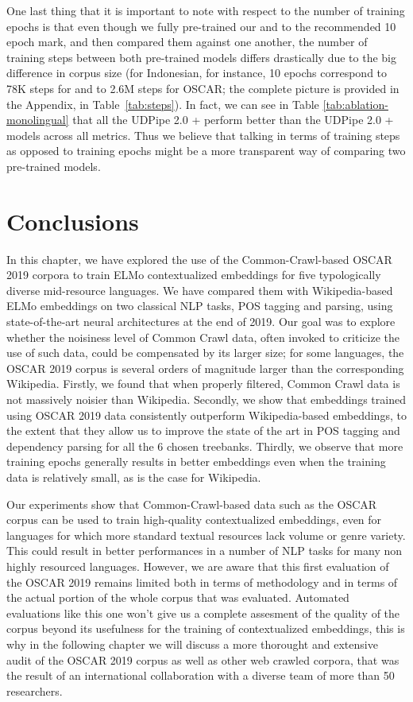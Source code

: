 One last thing that it is important to note with respect to the number of training epochs is that even though we fully pre-trained our \elmowikis and \elmooscars to the recommended 10 epoch mark, and then compared them against one another, the number of training steps between both pre-trained models differs drastically due to the big difference in corpus size (for Indonesian, for instance, 10 epochs correspond to 78K steps for \elmowiki and to 2.6M steps for OSCAR; the complete picture is provided in the Appendix, in Table~\ref{tab:steps}). In fact, we can see in Table \ref{tab:ablation-monolingual} that all the UDPipe 2.0 + \elmooscarone perform better than the UDPipe 2.0 + \elmowikione models across all metrics. Thus we believe that talking in terms of training steps as opposed to training epochs might be a more transparent way of comparing two pre-trained models.

\section{Conclusions}

In this chapter, we have explored the use of the Common-Crawl-based OSCAR 2019 corpora to train ELMo contextualized embeddings for five typologically diverse mid-resource languages. We have compared them with Wikipedia-based ELMo embeddings on two classical NLP tasks, POS tagging and parsing, using state-of-the-art neural architectures at the end of 2019. Our goal was to explore whether the noisiness level of Common Crawl data, often invoked to criticize the use of such data, could be compensated by its larger size; for some languages, the OSCAR 2019 corpus is several orders of magnitude larger than the corresponding Wikipedia. Firstly, we found that when properly filtered, Common Crawl data is not massively noisier than Wikipedia. Secondly, we show that embeddings trained using OSCAR 2019 data consistently outperform Wikipedia-based embeddings, to the extent that they allow us to improve the state of the art in POS tagging and dependency parsing for all the 6 chosen treebanks. Thirdly, we observe that more training epochs generally results in better embeddings even when the training data is relatively small, as is the case for Wikipedia.

Our experiments show that Common-Crawl-based data such as the OSCAR corpus can be used to train high-quality contextualized embeddings, even for languages for which more standard textual resources lack volume or genre variety. This could result in better performances in a number of NLP tasks for many non highly resourced languages. However, we are aware that this first evaluation of the OSCAR 2019 remains limited both in terms of methodology and in terms of the actual portion of the whole corpus that was evaluated. Automated evaluations like this one won't give us a complete assesment of the quality of the corpus beyond its usefulness for the training of contextualized embeddings, this is why in the following chapter we will discuss a more thorought and extensive audit of the OSCAR 2019 corpus as well as other web crawled corpora, that was the result of an international collaboration with a diverse team of more than 50 researchers.
